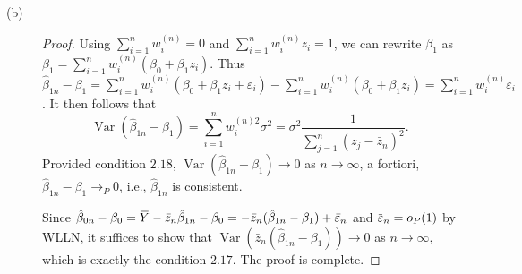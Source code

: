 \documentclass{article}
\newcommand{\eps}{\varepsilon}
\newcommand{\overbar}[1]{\mkern 1.5mu\overline{\mkern-1.5mu#1\mkern-1.5mu}\mkern 1.5mu}
\DeclareMathOperator*{\Var}{Var}
\theoremstyle{definition}
\theoremstyle{plain}
\theoremstyle{remark}
\begin{document}
\begin{description}
\begin{description}
\item[(b)]
\begin{proof}
Using $\sum_{i = 1}^n w_i^{(n)} = 0$ and $\sum_{i = 1}^n w_i^{(n)}z_i = 1$, we can rewrite $\beta_1$ as $\beta_1 = \sum_{i = 1}^n w_i^{(n)}(\beta_0 + \beta_1z_i)$. Thus $\hat{\beta}_{1n} - \beta_1 = \sum_{i = 1}^nw_i^{(n)} (\beta_0 + \beta_1z_i + \eps_i) - \sum_{i = 1}^n w_i^{(n)}(\beta_0 + \beta_1z_i) = \sum_{i = 1}^n w_i^{(n)}\eps_i$. It then follows that
$$\Var(\hat{\beta}_{1n} - \beta_1) = \sum_{i = 1}^n w_i^{(n)2} \sigma^2 = \sigma^2 \frac{1}{\sum_{j = 1}^n(z_j - \bar{z}_n)^2}.$$
Provided condition $2.18$, $\Var(\hat{\beta}_{1n} - \beta_1) \to 0$ as $n \to \infty$, a fortiori, $\hat{\beta}_{1n} - \beta_1 \to_P 0$, i.e., $\hat{\beta}_{1n}$ is consistent. 

Since $\hat{\beta}_{0n} - \beta_0 = \overbar{Y} - \bar{z}_n\hat{\beta}_{1n} - \beta_0 = -\bar{z}_n(\hat{\beta}_{1n} - \beta_1) + \bar{\eps}_n$ and $\overbar{\eps}_n = o_P(1)$ by WLLN, it suffices to show that $\Var(\bar{z}_n(\hat{\beta}_{1n} - \beta_1)) \to 0$ as $n \to \infty$, which is exactly the condition $2.17$. The proof is complete.
\end{proof}
\end{description}
\end{description}

\newpage
\end{document}
